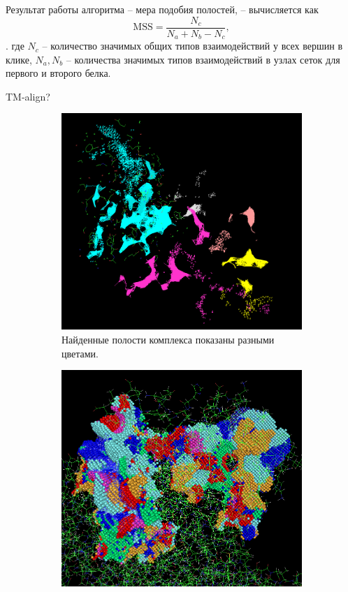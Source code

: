 \documentclass[a4paper,14pt]{article}         %
\begin{document}
Результат работы алгоритма -- мера подобия полостей, -- вычисляется как
\begin{equation}
\text{MSS} = \frac{N_c}{N_a + N_b - N_c},
\end{equation} \cite{Chartier2015}.
где $N_c$ -- количество значимых общих типов взаимодействий у всех вершин в клике, $N_a, N_b$ -- количества значимых типов взаимодействий в узлах сеток для первого и второго белка. 

\color{orange} TM-align?\color{black}
\begin{figure} 
	\caption{Визуализация работы (а) поиска полостей и (б)вычисления MIF(\color{orange} сделать картинки одного формата \color{black})} 
	\label{cleft_mif} 
	\begin{subfigure}{.45\textwidth}
		\centering
		\includegraphics[width=1\linewidth]{pictures/clefts}
		\caption{Найденные полости комплекса показаны разными цветами.}
		\label{fig:sfig1}
	\end{subfigure}
	\hfill
	\begin{subfigure}{.45\textwidth}
		\centering
		\includegraphics[width=1\linewidth]{pictures/mif}

\end{subfigure}
\end{figure}
\end{document}
